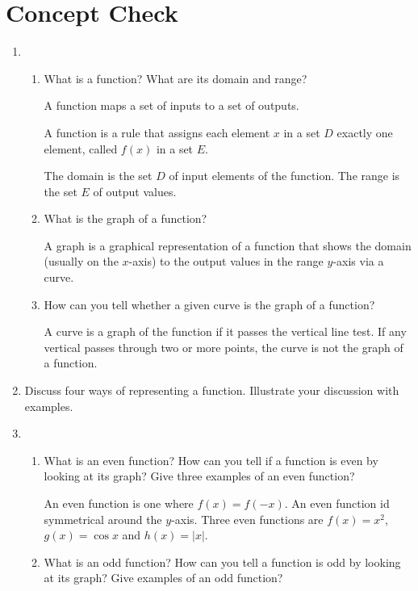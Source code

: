 \documentclass{article}
\begin{document}
	\section{Concept Check}

	\begin{enumerate}

		\item
		\begin{enumerate}
			\item What is a function? What are its domain and range?

			A function maps a set of inputs to a set of outputs. 

			A function is a rule that assigns each element $x$ in a
			set $D$ exactly one element, called $f(x)$ in a set $E$.

			The domain is the set $D$ of input elements of the function. The
			range is the set $E$ of output values.

			\item What is the graph of a function?

			A graph is a graphical representation of a function that shows
			the domain (usually on the $x$-axis) to the output values in
			the range $y$-axis via a curve.

			\item How can you tell whether a given curve is the graph of
			a function?

			A curve is a graph of the function if it passes the vertical line
			test. If any vertical passes through two or more points, the curve
			is not the graph of a function.
		\end{enumerate}

		\item Discuss four ways of representing a function. Illustrate your
			discussion with examples.

		\item
		\begin{enumerate}
			\item What is an even function? How can you tell if a function
				is even by looking at its graph? Give three examples
				of an even function?

				An even function is one where $f(x) = f(-x)$. An even
				function id symmetrical around the $y$-axis. Three
				even functions are $f(x) = x^2$, $g(x) = \cos x$ and
				$h(x) = |x|$.

			\item What is an odd function? How can you tell a function is
				odd by looking at its graph? Give examples of an odd
				function?


\end{enumerate}
\end{enumerate}
\end{document}
